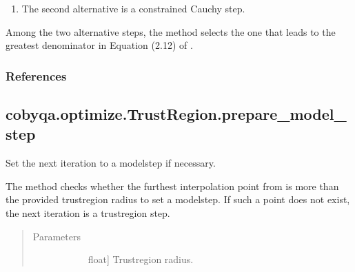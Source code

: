 \documentclass[letterpaper,10pt,english]{sphinxmanual}
\begin{document}
\begin{fulllineitems}
\begin{fulllineitems}
\begin{enumerate}
\item {} 
\sphinxAtStartPar
The second alternative is a constrained Cauchy step.

\end{enumerate}

\sphinxAtStartPar
Among the two alternative steps, the method selects the one that leads
to the greatest denominator in Equation (2.12) of .
\subsubsection*{References}

\sphinxAtStartPar
{}

\end{fulllineitems}



\subsection{cobyqa.optimize.TrustRegion.prepare\_model\_step}
\label{\detokenize{refs/generated/cobyqa.optimize.TrustRegion.prepare_model_step:cobyqa-optimize-trustregion-prepare-model-step}}\label{\detokenize{refs/generated/cobyqa.optimize.TrustRegion.prepare_model_step::doc}}

\begin{fulllineitems}
\label{\detokenize{refs/generated/cobyqa.optimize.TrustRegion.prepare_model_step:cobyqa.optimize.TrustRegion.prepare_model_step}}
\sphinxAtStartPar
Set the next iteration to a model\sphinxhyphen{}step if necessary.

\sphinxAtStartPar
The method checks whether the furthest interpolation point from
 is more than the provided trust\sphinxhyphen{}region radius to set a
model\sphinxhyphen{}step. If such a point does not exist, the next iteration is a
trust\sphinxhyphen{}region step.
\begin{quote}\begin{description}
\item[{Parameters}] \leavevmode\begin{description}
\item[{}] \leavevmode{[}float{]}
\sphinxAtStartPar
Trust\sphinxhyphen{}region radius.


\end{description}
\end{description}
\end{quote}
\end{fulllineitems}
\end{fulllineitems}
\end{document}
